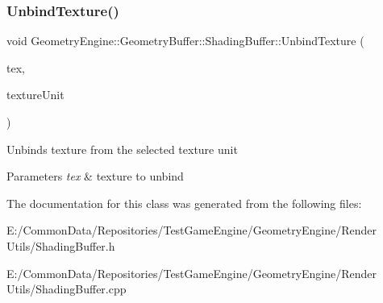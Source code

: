 \subsubsection{\texorpdfstring{UnbindTexture()}{UnbindTexture()}\hspace{0.1cm}{\footnotesize\ttfamily [2/2]}}
{\footnotesize\ttfamily void Geometry\+Engine\+::\+Geometry\+Buffer\+::\+Shading\+Buffer\+::\+Unbind\+Texture (\begin{DoxyParamCaption}\item[{\mbox{\hyperlink{class_geometry_engine_1_1_geometry_buffer_1_1_shading_buffer_a8047a079ff9fb9fa3400651664c92ae9}{S\+H\+A\+D\+I\+N\+G\+B\+U\+F\+F\+E\+R\+\_\+\+T\+E\+X\+T\+U\+R\+E\+\_\+\+T\+Y\+PE}}}]{tex,  }\item[{unsigned int}]{texture\+Unit }\end{DoxyParamCaption})}

Unbinds texture from the selected texture unit 
\begin{DoxyParams}{Parameters}
{\em tex} & texture to unbind \\
\hline
\end{DoxyParams}


The documentation for this class was generated from the following files\+:\begin{DoxyCompactItemize}
\item 
E\+:/\+Common\+Data/\+Repositories/\+Test\+Game\+Engine/\+Geometry\+Engine/\+Render Utils/Shading\+Buffer.\+h\item 
E\+:/\+Common\+Data/\+Repositories/\+Test\+Game\+Engine/\+Geometry\+Engine/\+Render Utils/Shading\+Buffer.\+cpp\end{DoxyCompactItemize}
